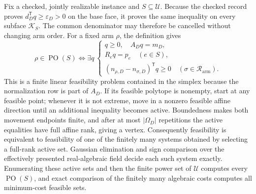 Fix a checked, jointly realizable instance and \(S\subseteq\mathcal U\).  Because the checked record proves \(d_D^{\mathsf T}q\geq\varepsilon_D>0\) on the base face, it proves the same inequality on every subface \(\mathcal K_S\).  The common denominator may therefore be cancelled without changing arm order.  For a fixed arm \(\rho\), the definition gives
\[
\rho\in\operatorname{PO}(S)
\Longleftrightarrow
\exists q\ \left\{
\begin{array}{l}
q\geq0,\quad A_Dq=m_D,\\
R_eq=p_e\quad(e\in S),\\
(n_{\rho,D}-n_{\sigma,D})^{\mathsf T}q\geq0
\quad(\sigma\in\mathcal R_{\mathrm{arm}}).
\end{array}\right.
\tag{1}
\]
This is a finite linear feasibility problem contained in the simplex because the normalization row is part of \(A_D\).  If its feasible polytope is nonempty, start at any feasible point; whenever it is not extreme, move in a nonzero feasible affine direction until an additional inequality becomes active.  Boundedness makes both movement endpoints finite, and after at most \(|\Omega_D|\) repetitions the active equalities have full affine rank, giving a vertex.  Consequently feasibility is equivalent to feasibility of one of the finitely many systems obtained by selecting a full-rank active set.  Gaussian elimination and sign comparison over the effectively presented real-algebraic field decide each such system exactly.  Enumerating these active sets and then the finite power set of \(\mathcal U\) computes every \(\operatorname{PO}(S)\), and exact comparison of the finitely many algebraic costs computes all minimum-cost feasible sets.

